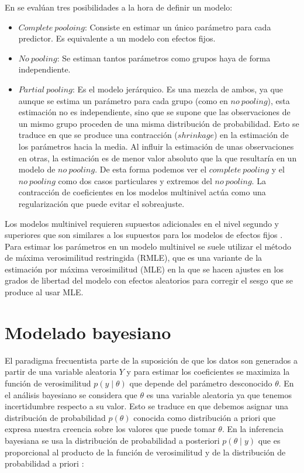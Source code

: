 \documentclass[
  12pt,
  a4paper,
  extrafontsizes,
  onecolumn,
  openright]{memoir}
\providecommand{\tightlist}{%
  \setlength{\itemsep}{0pt}\setlength{\parskip}{0pt}}\usepackage{longtable,booktabs,array}
\begin{document}
En \textcite{gelman2013} se evalúan tres posibilidades a la hora de
definir un modelo:

\begin{itemize}
\tightlist
\item
  \(Complete\ pooloing\): Consiste en estimar un único parámetro para
  cada predictor. Es equivalente a un modelo con efectos fijos.
\item
  \(No\ pooling\): Se estiman tantos parámetros como grupos haya de
  forma independiente.
\item
  \(Partial\ pooling\): Es el modelo jerárquico. Es una mezcla de ambos,
  ya que aunque se estima un parámetro para cada grupo (como en
  \(no\ pooling\)), esta estimación no es independiente, sino que se
  supone que las observaciones de un mismo grupo proceden de una misma
  distribución de probabilidad. Esto se traduce en que se produce una
  contracción (\(shrinkage\)) en la estimación de los parámetros hacia
  la media. Al influir la estimación de unas observaciones en otras, la
  estimación es de menor valor absoluto que la que resultaría en un
  modelo de \(no\ pooling\). De esta forma podemos ver el
  \(complete\ pooling\) y el \(no\ pooling\) como dos casos particulares
  y extremos del \(no\ pooling\). La contracción de coeficientes en los
  modelos multinivel actúa como una regularización que puede evitar el
  sobreajuste.
\end{itemize}

Los modelos multinivel requieren supuestos adicionales en el nivel
segundo y superiores que son similares a los supuestos para los modelos
de efectos fijos \autocite[ver][pp.~43]{chen2021}. Para estimar los
parámetros en un modelo multinivel se suele utilizar el método de máxima
verosimilitud restringida (RMLE), que es una variante de la estimación
por máxima verosimilitud (MLE) en la que se hacen ajustes en los grados
de libertad del modelo con efectos aleatorios para corregir el sesgo que
se produce al usar MLE.

\hypertarget{modelado-bayesiano}{%
\section{Modelado bayesiano}\label{modelado-bayesiano}}

El paradigma frecuentista parte de la suposición de que los datos son
generados a partir de una variable aleatoria \(Y\) y para estimar los
coeficientes se maximiza la función de verosimilitud
\(p(y \mid \theta)\) que depende del parámetro desconocido \(\theta\).
En el análisis bayesiano se considera que \(\theta\) es una variable
aleatoria ya que tenemos incertidumbre respecto a su valor. Esto se
traduce en que debemos asignar una distribución de probabilidad
\(p(\theta)\) conocida como distribución a priori que expresa nuestra
creencia sobre los valores que puede tomar \(\theta\). En la inferencia
bayesiana se usa la distribución de probabilidad a posteriori
\(p(\theta \mid y)\) que es proporcional al producto de la función de
verosimilitud y de la distribución de probabilidad a priori
\autocite[ver][]{nicenboim2023}:
\end{document}
